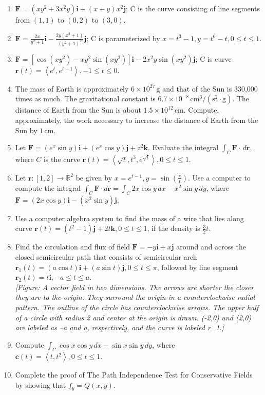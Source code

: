 \documentclass{exercises}
\begin{document}
\begin{enumerate}[resume]
\item $\mathbf{F}=(xy^{2}+3x^{2}y)\mathbf{i}+(x+y)x^{2}\mathbf{j}$; C is the curve consisting of line segments from $(1,1)$ to $(0,2)$ to $(3,0)$.
\item $\mathbf{F}=\frac{2x}{y^{2}+1}\mathbf{i}-\frac{2y(x^{2}+1)}{(y^{2}+1)^{2}}\mathbf{j}$; C is parameterized by $x=t^{3}-1,y=t^{6}-t,0\le t\le1$.
\item \techrequired $\mathbf{F}=[\cos(xy^{2})-xy^{2}\sin(xy^{2})]\mathbf{i}-2x^{2}y\sin(xy^{2})\mathbf{j}$; C is curve $\mathbf{r}(t)=\left\langle e^{t},e^{t+1} \right\rangle,-1\le t\le0$.
\item The mass of Earth is approximately $6\times 10^{27}\,\text{g}$ and that of the Sun is 330,000 times as much. The gravitational constant is $6.7\times 10^{-8}\,\text{cm}^{3}/(\text{s}^{2}\cdot \text{g})$. The distance of Earth from the Sun is about $1.5\times 10^{12}\,\text{cm}$. Compute, approximately, the work necessary to increase the distance of Earth from the Sun by $1\,\text{cm}$.
\item \techrequired Let $\mathbf{F}=(e^{x}\sin y)\mathbf{i}+(e^{x}\cos y)\mathbf{j}+z^{2}\mathbf{k}$. Evaluate the integral $\int_{C}\mathbf{F}\cdot \,d\mathbf{r}$, where $C$ is the curve $\mathbf{r}(t)=\left\langle \sqrt{t},t^{3},e^{\sqrt{t}} \right\rangle,0\le t\le1$.
\item \techrequired Let $\mathbf{r}:[1,2]\to \mathbb{R}^{2}$ be given by $x=e^{t-1},y=\sin(\frac{\pi}{t})$. Use a computer to compute the integral $\int_{C}\mathbf{F}\cdot d\mathbf{r}=\int_{C}2x\cos y\,dx-x^{2}\sin y\,dy$, where $\mathbf{F}=(2x\cos y)\mathbf{i}-(x^{2}\sin y)\mathbf{j}$.
\item \techrequired Use a computer algebra system to find the mass of a wire that lies along curve $\mathbf{r}(t)=(t^{2}-1)\mathbf{j}+2t\mathbf{k},0\le t\le1$, if the density is $\frac{3}{2}t$.
\item Find the circulation and flux of field $\mathbf{F}=-y\mathbf{i}+x\mathbf{j}$ around and across the closed semicircular path that consists of semicircular arch $\mathbf{r}_{1}(t)=(a\cos t)\mathbf{i}+(a\sin t)\mathbf{j},0\le t\le \pi$, followed by line segment $\mathbf{r}_{2}(t)=t\mathbf{i},-a\le t\le a$. \\ \textit{[Figure: A vector field in two dimensions. The arrows are shorter the closer they are to the origin. They surround the origin in a counterclockwise radial pattern. The outline of the circle has counterclockwise arrows. The upper half of a circle with radius 2 and center at the origin is drawn. (-2,0) and (2,0) are labeled as --a and a, respectively, and the curve is labeled r\_1.]}
\item Compute $\int_{C}\cos x\cos y\,dx-\sin x\sin y\,dy$, where $\mathbf{c}(t)=\left\langle t,t^{2} \right\rangle,0\le t\le1$.
\item Complete the proof of The Path Independence Test for Conservative Fields by showing that $f_{y}=Q(x,y)$.
\end{enumerate}
\end{document}
